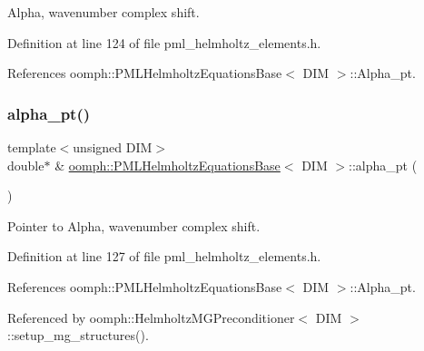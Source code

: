 Alpha, wavenumber complex shift. 



Definition at line 124 of file pml\+\_\+helmholtz\+\_\+elements.\+h.



References oomph\+::\+P\+M\+L\+Helmholtz\+Equations\+Base$<$ D\+I\+M $>$\+::\+Alpha\+\_\+pt.

\mbox{\label{classoomph_1_1PMLHelmholtzEquationsBase_aaf031eceaf091f839e349040d88f69bf}} 
\subsubsection{\texorpdfstring{alpha\+\_\+pt()}{alpha\_pt()}}
{\footnotesize\ttfamily template$<$unsigned D\+IM$>$ \\
double$\ast$ \& \hyperlink{classoomph_1_1PMLHelmholtzEquationsBase}{oomph\+::\+P\+M\+L\+Helmholtz\+Equations\+Base}$<$ D\+IM $>$\+::alpha\+\_\+pt (\begin{DoxyParamCaption}{ }\end{DoxyParamCaption})\hspace{0.3cm}{\ttfamily [inline]}}



Pointer to Alpha, wavenumber complex shift. 



Definition at line 127 of file pml\+\_\+helmholtz\+\_\+elements.\+h.



References oomph\+::\+P\+M\+L\+Helmholtz\+Equations\+Base$<$ D\+I\+M $>$\+::\+Alpha\+\_\+pt.



Referenced by oomph\+::\+Helmholtz\+M\+G\+Preconditioner$<$ D\+I\+M $>$\+::setup\+\_\+mg\+\_\+structures().

\mbox{\label{classoomph_1_1PMLHelmholtzEquationsBase_a85866aff4a5644c26663ca73ed166c1b}} 
